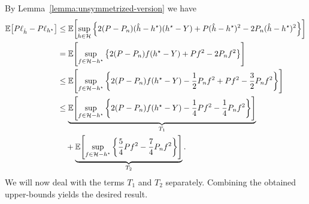 \documentclass[main.tex]{subfiles}
\begin{document}
By Lemma~\ref{lemma:unsymmetrized-version} we have
\begin{align*}
  \mathbb{E}\!\left[{P\ell_{\hat{h}} - P\ell_{h^{\star}}}\right]
  &\leq
    \mathbb{E}\!\left[{
      \sup_{h \in \mathcal{H}}
      \left\{
      2(P-P_{n})(\hat{h} - h^{\star})(h^{\star} - Y)
      + P(\hat{h} - h^{\star})^{2} - 2P_{n}(\hat{h} - h^{\star})^{2}
      \right\}
     }\right] \\
  &=
    \mathbb{E}\!\left[{
      \sup_{f \in \mathcal{H} - h^{\star}}
      \left\{
      2(P-P_{n})f(h^{\star} - Y)
      + Pf^{2} - 2P_{n}f^{2}
      \right\}
     }\right] \\
  &\leq
    \mathbb{E}\!\left[{
      \sup_{f \in \mathcal{H} - h^{\star}}
      \left\{
      2(P-P_{n})f(h^{\star} - Y) - \frac{1}{2}P_{n}f^{2}
      + Pf^{2} - \frac{3}{2}P_{n}f^{2}
      \right\}
     }\right] \\
  &\leq
    \underbrace{
      \mathbb{E}\!\left[{
        \sup_{f \in \mathcal{H} - h^{\star}}
        \left\{
        2(P-P_{n})f(h^{\star} - Y) - \frac{1}{4}Pf^{2} - \frac{1}{4}P_{n}f^{2}
        \right\}
       }\right]
    }_{T_{1}} \\
    &\quad+
    \underbrace{
      \mathbb{E}\!\left[{
        \sup_{f \in \mathcal{H} - h^{\star}}
        \left\{
        \frac{5}{4}Pf^{2} - \frac{7}{4}P_{n}f^{2}
        \right\}
       }\right]
    }_{T_{2}}.
\end{align*}
We will now deal with the terms $T_{1}$ and $T_{2}$ separately.
Combining the obtained upper-bounds yields the desired result.


\end{document}
